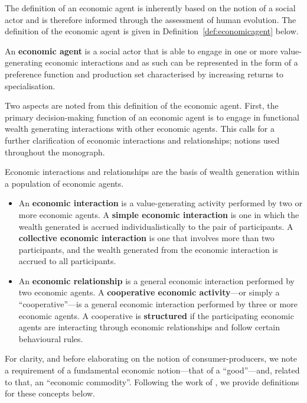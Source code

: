The definition of an economic agent is inherently based on the notion of a social actor and is therefore informed through the assessment of human evolution. The definition of the economic agent is given in Definition~\ref{def:economicagent} below.
\begin{definition} \label{def:economicagent}
An \textbf{economic agent} is a social actor that is able to engage in one or more value-generating economic interactions and as such can be represented in the form of a preference function and production set characterised by increasing returns to specialisation.
\end{definition}
Two aspects are noted from this definition of the economic agent. First, the primary decision-making function of an economic agent is to engage in functional wealth generating interactions with other economic agents. This calls for a further clarification of economic interactions and relationships; notions used throughout the monograph.
\begin{definition}
Economic interactions and relationships are the basis of wealth generation within a population of economic agents.
\begin{itemize}
\item An \textbf{economic interaction} is a value-generating activity performed by two or more economic agents. A \textbf{simple economic interaction} is one in which the wealth generated is accrued individualistically to the pair of participants. A \textbf{collective economic interaction} is one that involves more than two participants, and the wealth generated from the economic interaction is accrued to all participants.

\item An \textbf{economic relationship} is a general economic interaction performed by two economic agents. A \textbf{cooperative economic activity}---or simply a ``cooperative''---is a general economic interaction performed by three or more economic agents. A cooperative is \textbf{structured} if the participating economic agents are interacting through economic relationships and follow certain behavioural rules.
\end{itemize}
\end{definition}
For clarity, and before elaborating on the notion of consumer-producers, we note a requirement of a fundamental economic notion---that of a ``good''---and, related to that, an ``economic commodity''. Following the work of \citet{Lancaster1966}, we provide definitions for these concepts below.
